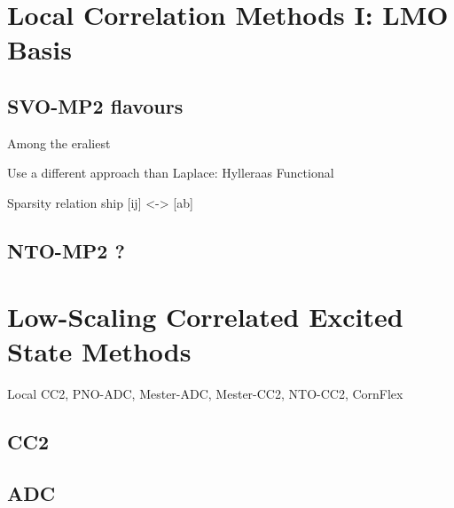 \section{Local Correlation Methods I: LMO Basis}


\subsection{SVO-MP2 flavours}

Among the eraliest

Use a different approach than Laplace: Hylleraas Functional

Sparsity relation ship [ij] <-> [ab]

\subsection{NTO-MP2 ?}




\section{Low-Scaling Correlated Excited State Methods}
Local CC2, PNO-ADC, Mester-ADC, Mester-CC2, NTO-CC2, CornFlex


\subsection{CC2}


\subsection{ADC}

